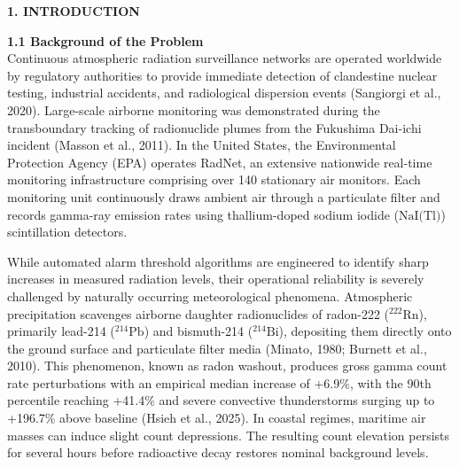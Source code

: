 \documentclass[11pt,a4paper]{article}
\begin{document}
\begin{framed}
\noindent\textbf{1. INTRODUCTION}\\[0.6em]
\noindent\textbf{1.1 Background of the Problem}\\[0.3em]
Continuous atmospheric radiation surveillance networks are operated worldwide by regulatory authorities to provide immediate detection of clandestine nuclear testing, industrial accidents, and radiological dispersion events (Sangiorgi et al., 2020). Large-scale airborne monitoring was demonstrated during the transboundary tracking of radionuclide plumes from the Fukushima Dai-ichi incident (Masson et al., 2011). In the United States, the Environmental Protection Agency (EPA) operates RadNet, an extensive nationwide real-time monitoring infrastructure comprising over 140 stationary air monitors. Each monitoring unit continuously draws ambient air through a particulate filter and records gamma-ray emission rates using thallium-doped sodium iodide ($\text{NaI(Tl)}$) scintillation detectors. 

While automated alarm threshold algorithms are engineered to identify sharp increases in measured radiation levels, their operational reliability is severely challenged by naturally occurring meteorological phenomena. Atmospheric precipitation scavenges airborne daughter radionuclides of radon-222 ($^{222}\text{Rn}$), primarily lead-214 ($^{214}\text{Pb}$) and bismuth-214 ($^{214}\text{Bi}$), depositing them directly onto the ground surface and particulate filter media (Minato, 1980; Burnett et al., 2010). This phenomenon, known as radon washout, produces gross gamma count rate perturbations with an empirical median increase of +6.9\%, with the 90th percentile reaching +41.4\% and severe convective thunderstorms surging up to +196.7\% above baseline (Hsieh et al., 2025). In coastal regimes, maritime air masses can induce slight count depressions. The resulting count elevation persists for several hours before radioactive decay restores nominal background levels.


\end{framed}
\end{document}
